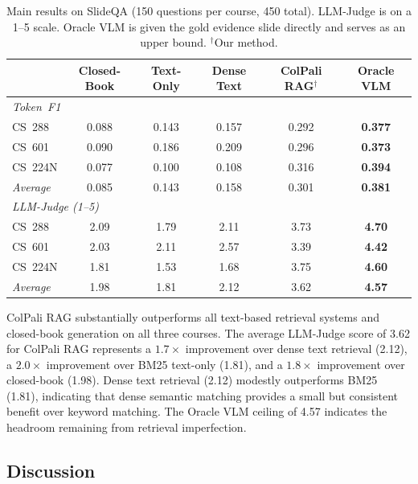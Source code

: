 \documentclass{article} %
\begin{document}
\begin{table}[htbp]
\caption{Main results on SlideQA (150 questions per course, 450 total). LLM-Judge is on a 1--5 scale. Oracle VLM is given the gold evidence slide directly and serves as an upper bound. $^\dagger$Our method.}
\label{tab:main_results}
\begin{center}
\begin{tabular}{lccccc}
\toprule
 & \textbf{Closed-Book} & \textbf{Text-Only} & \textbf{Dense Text} & \textbf{ColPali RAG}$^\dagger$ & \textbf{Oracle VLM} \\
\midrule
\multicolumn{6}{l}{\textit{Token~F1}} \\
\quad CS~288  & 0.088 & 0.143 & 0.157 & 0.292 & \textbf{0.377} \\
\quad CS~601  & 0.090 & 0.186 & 0.209 & 0.296 & \textbf{0.373} \\
\quad CS~224N & 0.077 & 0.100 & 0.108 & 0.316 & \textbf{0.394} \\
\quad \textit{Average} & 0.085 & 0.143 & 0.158 & 0.301 & \textbf{0.381} \\
\midrule
\multicolumn{6}{l}{\textit{LLM-Judge (1--5)}} \\
\quad CS~288  & 2.09 & 1.79 & 2.11 & 3.73 & \textbf{4.70} \\
\quad CS~601  & 2.03 & 2.11 & 2.57 & 3.39 & \textbf{4.42} \\
\quad CS~224N & 1.81 & 1.53 & 1.68 & 3.75 & \textbf{4.60} \\
\quad \textit{Average} & 1.98 & 1.81 & 2.12 & 3.62 & \textbf{4.57} \\
\bottomrule
\end{tabular}
\end{center}
\end{table}

ColPali RAG substantially outperforms all text-based retrieval systems and closed-book generation on all three courses. The average LLM-Judge score of 3.62 for ColPali RAG represents a $1.7\times$ improvement over dense text retrieval (2.12), a $2.0\times$ improvement over BM25 text-only (1.81), and a $1.8\times$ improvement over closed-book (1.98). Dense text retrieval (2.12) modestly outperforms BM25 (1.81), indicating that dense semantic matching provides a small but consistent benefit over keyword matching. The Oracle VLM ceiling of 4.57 indicates the headroom remaining from retrieval imperfection.

\subsection{Discussion}
\end{document}
